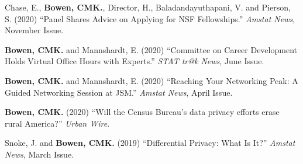 \documentclass[11pt, letterpaper, roman]{moderncv} %
\begin{document}
\begin{etaremune}[topsep=0pt, itemsep=6pt, partopsep=0pt, parsep=0pt]
    \item Chase, E., \textbf{Bowen, CMK.}, Director, H., Baladandayuthapani, V. and Pierson, S. (2020) ``Panel Shares Advice on Applying for NSF Fellowships.'' \textit{Amstat News}, November Issue.

    \item \textbf{Bowen, CMK.} and Mannshardt, E. (2020) ``Committee on Career Development Holds Virtual Office Hours with Experts.'' \textit{STAT tr@k News}, June Issue.

    \item \textbf{Bowen, CMK.} and Mannshardt, E. (2020) ``Reaching Your Networking Peak: A Guided Networking Session at JSM.'' \textit{Amstat News}, April Issue.
    
    \item \textbf{Bowen, CMK.} (2020) ``Will the Census Bureau's data privacy efforts erase rural America?'' \textit{Urban Wire}. 
    
    \item Snoke, J. and \textbf{Bowen, CMK.} (2019) ``Differential Privacy: What Is It?'' \textit{Amstat News}, March Issue.
\end{etaremune}

\end{document}
